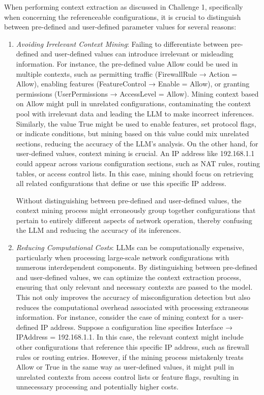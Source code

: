 When performing context extraction as discussed in Challenge 1, specifically when concerning the referenceable configurations, it is crucial to distinguish between pre-defined and user-defined parameter values for several reasons:
\begin{enumerate}
    \item \textit{Avoiding Irrelevant Context Mining}: Failing to differentiate between pre-defined and user-defined values can introduce irrelevant or misleading information. For instance, the pre-defined value Allow could be used in multiple contexts, such as permitting traffic (FirewallRule → Action = Allow), enabling features (FeatureControl → Enable = Allow), or granting permissions (UserPermissions → AccessLevel = Allow). Mining context based on Allow might pull in unrelated configurations, contaminating the context pool with irrelevant data and leading the LLM to make incorrect inferences. Similarly, the value True might be used to enable features, set protocol flags, or indicate conditions, but mining based on this value could mix unrelated sections, reducing the accuracy of the LLM's analysis.
    On the other hand, for user-defined values, context mining is crucial. An IP address like 192.168.1.1 could appear across various configuration sections, such as NAT rules, routing tables, or access control lists. In this case, mining should focus on retrieving all related configurations that define or use this specific IP address.
    
    Without distinguishing between pre-defined and user-defined values, the context mining process might erroneously group together configurations that pertain to entirely different aspects of network operation, thereby confusing the LLM and reducing the accuracy of its inferences.

    \item \textit{Reducing Computational Costs}: LLMs can be computationally expensive, particularly when processing large-scale network configurations with numerous interdependent components. By distinguishing between pre-defined and user-defined values, we can optimize the context extraction process, ensuring that only relevant and necessary contexts are passed to the model. This not only improves the accuracy of misconfiguration detection but also reduces the computational overhead associated with processing extraneous information.
    For instance, consider the case of mining context for a user-defined IP address. Suppose a configuration line specifies Interface → IPAddress = 192.168.1.1. In this case, the relevant context might include other configurations that reference this specific IP address, such as firewall rules or routing entries. However, if the mining process mistakenly treats Allow or True in the same way as user-defined values, it might pull in unrelated contexts from access control lists or feature flags, resulting in unnecessary processing and potentially higher costs.
\end{enumerate}

